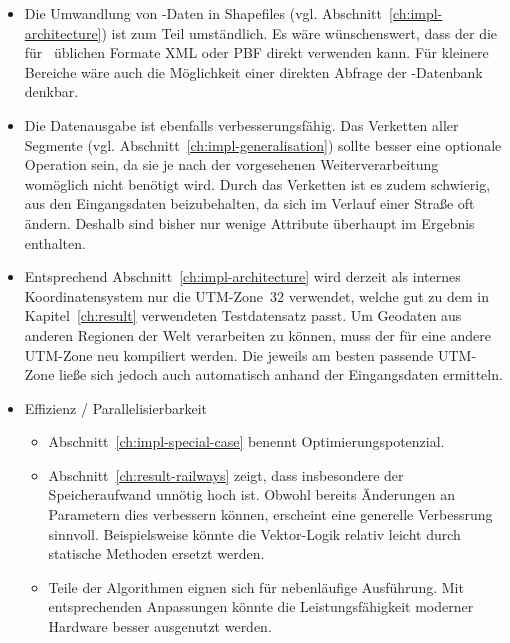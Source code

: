 \documentclass[../main/thesis.tex]{subfiles}
\begin{document}
\begin{itemize}

\item
Die Umwandlung von \osm-Daten in Shapefiles (vgl. Abschnitt~\ref{ch:impl-architecture}) ist zum Teil umständlich.
Es wäre wünschenswert, dass der  die für \osm\ üblichen Formate XML oder PBF direkt verwenden kann.
Für kleinere Bereiche wäre auch die Möglichkeit einer direkten Abfrage der \osm-Datenbank denkbar.

\item
Die Datenausgabe ist ebenfalls verbesserungsfähig.
Das Verketten aller Segmente (vgl. Abschnitt~\ref{ch:impl-generalisation}) sollte besser eine optionale Operation sein, da sie je nach der vorgesehenen Weiterverarbeitung womöglich nicht benötigt wird.
Durch das Verketten ist es zudem schwierig,  aus den Eingangsdaten beizubehalten, da sich  im Verlauf einer Straße oft ändern.
Deshalb sind bisher nur wenige Attribute überhaupt im Ergebnis enthalten.

\item
Entsprechend Abschnitt~\ref{ch:impl-architecture} wird derzeit als internes Koordinatensystem nur die UTM-Zone~32 verwendet, welche gut zu dem in Kapitel~\ref{ch:result} verwendeten Testdatensatz passt.
Um Geodaten aus anderen Regionen der Welt verarbeiten zu können, muss der  für eine andere UTM-Zone neu kompiliert werden.
Die jeweils am besten passende UTM-Zone ließe sich jedoch auch automatisch anhand der Eingangsdaten ermitteln.

\item Effizienz / Parallelisierbarkeit

\begin{itemize}[nosep]
\item
Abschnitt~\ref{ch:impl-special-case} benennt Optimierungspotenzial.
\item
Abschnitt~\ref{ch:result-railways} zeigt, dass insbesondere der Speicheraufwand unnötig hoch ist. Obwohl bereits Änderungen an Parametern dies verbessern können, erscheint eine generelle Verbessrung sinnvoll. Beispielsweise könnte die Vektor-Logik relativ leicht durch statische Methoden ersetzt werden.
\item
Teile der Algorithmen eignen sich für nebenläufige Ausführung.
Mit entsprechenden Anpassungen könnte die Leistungsfähigkeit moderner Hardware besser ausgenutzt werden.
\end{itemize}


\end{itemize}
\end{document}
